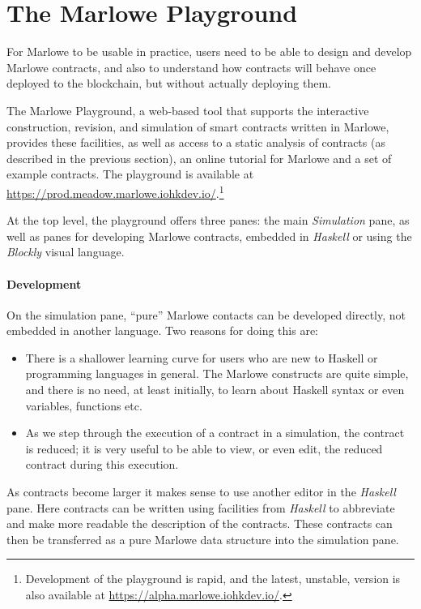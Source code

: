 \documentclass[runningheads]{llncs}
\begin{document}
\section{The Marlowe Playground}
\label{sec:playground}

For Marlowe to be usable in practice, users need to be able to design and develop Marlowe contracts, and also to understand how contracts will behave once deployed to the blockchain, but without actually deploying them.

The Marlowe Playground, a web-based tool that supports the interactive construction, revision, and simulation of smart contracts written in Marlowe, provides these facilities, as well as access to a static analysis of contracts (as described in the previous section), an online tutorial for Marlowe and a set of example contracts. The playground is available at \url{https://prod.meadow.marlowe.iohkdev.io/}.\footnote{Development of the playground is rapid, and the latest, unstable, version is also available at \url{https://alpha.marlowe.iohkdev.io/}.}

At the top level, the playground offers three panes: the main \emph{Simulation} pane, as well as panes for developing Marlowe contracts, embedded in \emph{Haskell} or using the \emph{Blockly} visual language.

\paragraph{Development}

On the simulation pane, ``pure'' Marlowe contacts can be developed directly, not embedded in another language. Two reasons for doing this are:
\begin{itemize}
    \item There is a shallower learning curve for users who are new to Haskell or programming languages in general. The Marlowe constructs are quite simple, and there is no need, at least initially, to learn about Haskell syntax or even variables, functions etc.
    \item As we step through the execution of a contract in a simulation, the contract is reduced; it is very useful to be able to view, or even edit, the reduced contract during this execution.
\end{itemize}
As contracts become larger it makes sense to use another editor in the \emph{Haskell} pane. Here contracts can be written using facilities from \emph{Haskell} to abbreviate and make more readable the description of the contracts. These contracts can then be transferred as a pure Marlowe data structure into the simulation pane.
\end{document}
